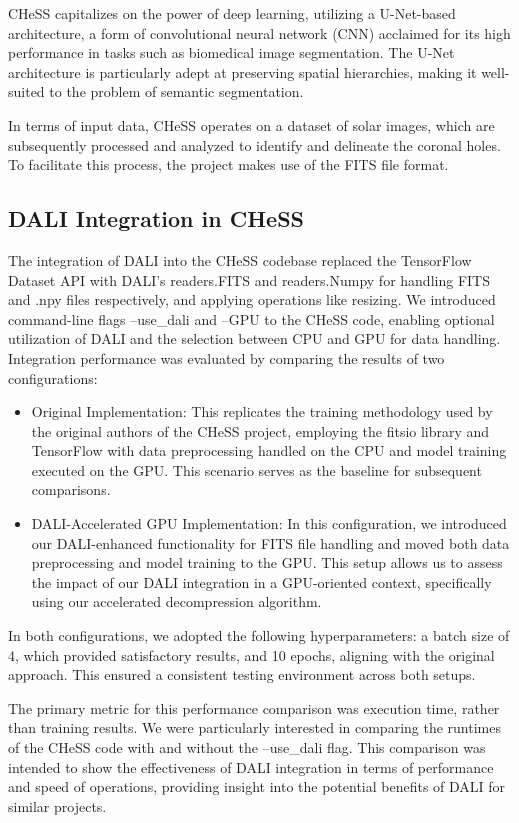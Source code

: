\documentclass[licencjacka,en]{pracamgr}
\begin{document}
CHeSS capitalizes on the power of deep learning, utilizing a U-Net-based architecture, a form of convolutional neural network (CNN) acclaimed for its high performance in tasks such as biomedical image segmentation. The U-Net architecture is particularly adept at preserving spatial hierarchies, making it well-suited to the problem of semantic segmentation.

In terms of input data, CHeSS operates on a dataset of solar images, which are subsequently processed and analyzed to identify and delineate the coronal holes. To facilitate this process, the project makes use of the FITS file format. 


\subsection{DALI Integration in CHeSS}

The integration of DALI into the CHeSS codebase replaced the TensorFlow Dataset API with DALI's readers.FITS and readers.Numpy for handling FITS and .npy files respectively, and applying operations like resizing. We introduced command-line flags --use\_dali and --GPU to the CHeSS code, enabling optional utilization of DALI and the selection between CPU and GPU for data handling. Integration performance was evaluated by comparing the results of two configurations:
\begin{itemize}
\item Original Implementation: This replicates the training methodology used by the original authors of the CHeSS project, employing the fitsio library and TensorFlow with data preprocessing handled on the CPU and model training executed on the GPU. This scenario serves as the baseline for subsequent comparisons.
\item DALI-Accelerated GPU Implementation: In this configuration, we introduced our DALI-enhanced functionality for FITS file handling and moved both data preprocessing and model training to the GPU. This setup allows us to assess the impact of our DALI integration in a GPU-oriented context, specifically using our accelerated decompression algorithm.
\end{itemize}

In both configurations, we adopted the following hyperparameters: a batch size of 4, which provided satisfactory results, and 10 epochs, aligning with the original approach. This ensured a consistent testing environment across both setups.

The primary metric for this performance comparison was execution time, rather than training results. We were particularly interested in comparing the runtimes of the CHeSS code with and without the --use\_dali flag. This comparison was intended to show the effectiveness of DALI integration in terms of performance and speed of operations, providing insight into the potential benefits of DALI for similar projects.
\end{document}
